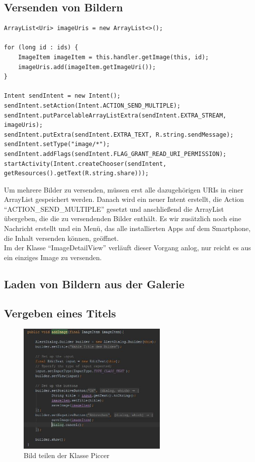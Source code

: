 \subsection{Versenden von Bildern}

\begin{lstlisting}
ArrayList<Uri> imageUris = new ArrayList<>();

for (long id : ids) {
    ImageItem imageItem = this.handler.getImage(this, id);
    imageUris.add(imageItem.getImageUri());
}

Intent sendIntent = new Intent();
sendIntent.setAction(Intent.ACTION_SEND_MULTIPLE);
sendIntent.putParcelableArrayListExtra(sendIntent.EXTRA_STREAM, imageUris);
sendIntent.putExtra(sendIntent.EXTRA_TEXT, R.string.sendMessage);
sendIntent.setType("image/*");
sendIntent.addFlags(sendIntent.FLAG_GRANT_READ_URI_PERMISSION);
startActivity(Intent.createChooser(sendIntent, getResources().getText(R.string.share)));
\end{lstlisting}
Um mehrere Bilder zu versenden, müssen erst alle dazugehörigen URIs in einer ArrayList gespeichert werden. Danach wird ein neuer Intent erstellt, die Action \enquote{ACTION\_SEND\_MULTIPLE} gesetzt und anschließend die ArrayList übergeben, die die zu versendenden Bilder enthält. Es wir zusätzlich noch eine Nachricht erstellt und ein Menü, das alle installierten Apps auf dem Smartphone, die Inhalt versenden können, geöffnet.\\
Im der Klasse \enquote{ImageDetailView} verläuft dieser Vorgang anlog, nur reicht es aus  ein einziges Image zu versenden. 

\subsection{Laden von Bildern aus der Galerie}
\subsection{Vergeben eines Titels}
\begin{figure}[H]
\label{Share_Item}
\centering
\includegraphics[width=0.65\textwidth]{images/Dialog}
\caption{Bild teilen der Klasse Piccer}
\end{figure}
